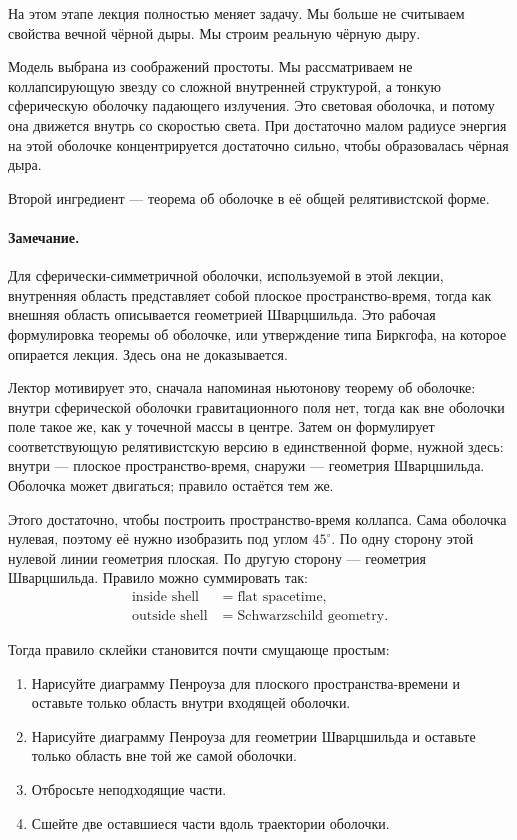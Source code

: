 На этом этапе лекция полностью меняет задачу. Мы больше не считываем свойства вечной чёрной дыры. Мы строим реальную чёрную дыру.

Модель выбрана из соображений простоты. Мы рассматриваем не коллапсирующую звезду со сложной внутренней структурой, а тонкую сферическую оболочку падающего излучения. Это световая оболочка, и потому она движется внутрь со скоростью света. При достаточно малом радиусе энергия на этой оболочке концентрируется достаточно сильно, чтобы образовалась чёрная дыра.

Второй ингредиент — теорема об оболочке в её общей релятивистской форме.

\paragraph{Замечание.} Для сферически-симметричной оболочки, используемой в этой лекции, внутренняя область представляет собой плоское пространство-время, тогда как внешняя область описывается геометрией Шварцшильда. Это рабочая формулировка теоремы об оболочке, или утверждение типа Биркгофа, на которое опирается лекция. Здесь она не доказывается.

Лектор мотивирует это, сначала напоминая ньютонову теорему об оболочке: внутри сферической оболочки гравитационного поля нет, тогда как вне оболочки поле такое же, как у точечной массы в центре. Затем он формулирует соответствующую релятивистскую версию в единственной форме, нужной здесь: внутри — плоское пространство-время, снаружи — геометрия Шварцшильда. Оболочка может двигаться; правило остаётся тем же.

Этого достаточно, чтобы построить пространство-время коллапса. Сама оболочка нулевая, поэтому её нужно изобразить под углом \(45^\circ\). По одну сторону этой нулевой линии геометрия плоская. По другую сторону — геометрия Шварцшильда. Правило можно суммировать так:
\begin{equation}
\begin{aligned}
\text{inside shell} &= \text{flat spacetime},\\
\text{outside shell} &= \text{Schwarzschild geometry}.
\end{aligned}
\end{equation}

Тогда правило склейки становится почти смущающе простым:

\begin{enumerate}
\item Нарисуйте диаграмму Пенроуза для плоского пространства-времени и оставьте только область внутри входящей оболочки.
\item Нарисуйте диаграмму Пенроуза для геометрии Шварцшильда и оставьте только область вне той же самой оболочки.
\item Отбросьте неподходящие части.
\item Сшейте две оставшиеся части вдоль траектории оболочки.
\end{enumerate}

